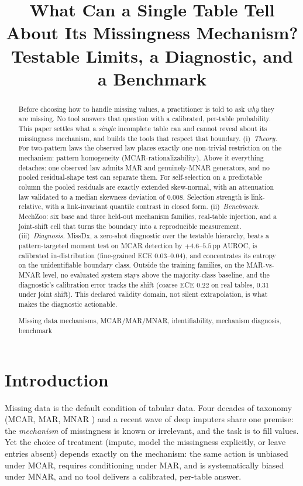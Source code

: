 \documentclass[conference]{IEEEtran}
\title{What Can a Single Table Tell About Its Missingness Mechanism?\\
Testable Limits, a Diagnostic, and a Benchmark}
\author{
\IEEEauthorblockN{Nan Hu, Xueqiong Li, Huibin Tan, Guijian Tang, Huang ziyin, Ji Wang}
\IEEEauthorblockA{\textit{School of Computer Science} \\
\textit{National University of Defense Technology} \\
Changsha, Hunan}
}
\begin{document}
\maketitle

\begin{abstract}
Before choosing how to handle missing values, a practitioner is told to ask \emph{why} they are
missing. No tool answers that question with a calibrated, per-table probability. This paper
settles what a \emph{single} incomplete table can and cannot reveal about its missingness
mechanism, and builds the tools that respect that boundary.
(i)~\emph{Theory.} For two-pattern laws the observed law places exactly one non-trivial
restriction on the mechanism: pattern homogeneity (MCAR-rationalizability). Above it everything
detaches: one observed law admits MAR and genuinely-MNAR generators, and no pooled
residual-shape test can separate them. For self-selection on a predictable column the pooled
residuals are exactly extended skew-normal, with an attenuation law validated to a median
skewness deviation of $0.008$. Selection strength is link-relative, with a link-invariant
quantile contrast in closed form.
(ii)~\emph{Benchmark.} MechZoo: six base and three held-out mechanism families, real-table
injection, and a joint-shift cell that turns the boundary into a reproducible measurement.
(iii)~\emph{Diagnosis.} MissDx, a zero-shot diagnostic over the testable hierarchy, beats a
pattern-targeted moment test on MCAR detection by $+4.6$--$5.5$\,pp AUROC, is calibrated
in-distribution (fine-grained ECE $0.03$--$0.04$), and concentrates its entropy on the
unidentifiable boundary class. Outside the training families, on the MAR-vs-MNAR level, no
evaluated system stays above the majority-class baseline, and the diagnostic's calibration error
tracks the shift (coarse ECE $0.22$ on real tables, $0.31$ under joint shift). This declared
validity domain, not silent extrapolation, is what makes the diagnostic actionable.
\begin{IEEEkeywords}Missing data mechanisms, MCAR/MAR/MNAR, identifiability, mechanism diagnosis, benchmark\end{IEEEkeywords}
\end{abstract}



\section{Introduction}
Missing data is the default condition of tabular data. Four decades of taxonomy (MCAR, MAR, MNAR
\cite{rubin1976}) and a recent wave of deep imputers share one premise: the \emph{mechanism} of
missingness is known or irrelevant, and the task is to fill values. Yet the choice of
treatment (impute, model the missingness explicitly, or leave entries absent) depends exactly on
the mechanism: the same action is unbiased under MCAR, requires conditioning under MAR, and is
systematically biased under MNAR, and no tool delivers a calibrated, per-table answer.
\end{document}

